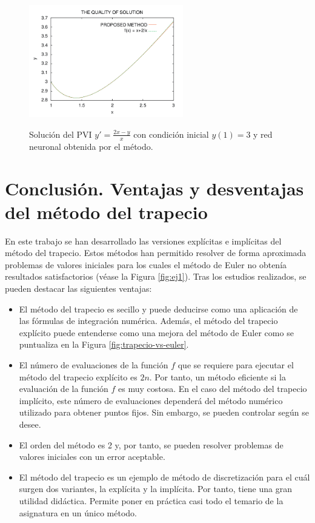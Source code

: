 \documentclass{article}
\theoremstyle{theorem-style}  %
\theoremstyle{definition-style}
\theoremstyle{example-style}
\begin{document}
	\begin{figure}[H]
		\centering
		\includegraphics[width=0.6\textwidth]{./Images/nn-error.png}
		\label{fig:nn-error}
		\caption{Solución del PVI $y' = \frac{2x - y}{x}$ con condición inicial $y(1) = 3$ y red neuronal obtenida por el método.}
	\end{figure}


\section{Conclusión. Ventajas y desventajas del método del trapecio} \label{sec:conclusion}

	En este trabajo se han desarrollado las versiones explícitas e implícitas del método del trapecio. Estos métodos han permitido resolver de forma aproximada problemas de valores iniciales para los cuales el método de Euler no obtenía resultados satisfactorios (véase la Figura \ref{fig:ej1}). Tras los estudios realizados, se pueden destacar las siguientes ventajas:
	
	\begin{itemize}
		\item El método del trapecio es secillo y puede deducirse como una aplicación de las fórmulas de integración numérica. Además, el método del trapecio explícito puede entenderse como una mejora del método de Euler como se puntualiza en la Figura \ref{fig:trapecio-vs-euler}.
		\item El número de evaluaciones de la función $f$ que se requiere para ejecutar el método del trapecio explícito es $2n$. Por tanto, un método eficiente si la evaluación de la función $f$ es muy costosa. En el caso del método del trapecio implícito, este número de evaluaciones dependerá del método numérico utilizado para obtener puntos fijos. Sin embargo, se pueden controlar según se desee.
		\item El orden del método es 2 y, por tanto, se pueden resolver problemas de valores iniciales con un error aceptable.
		\item El método del trapecio es un ejemplo de método de discretización para el cuál surgen dos variantes, la explícita y la implícita. Por tanto, tiene una gran utilidad didáctica. Permite poner en práctica casi todo el temario de la asignatura en un único método.
	\end{itemize}
\end{document}
